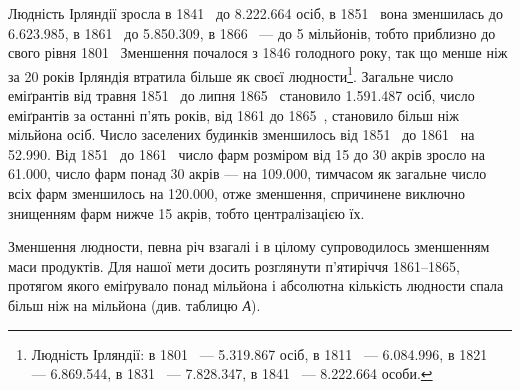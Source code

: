 Людність Ірляндії зросла в 1841~ до \num{8.222.664} осіб, в 1851~
вона зменшилась до \num{6.623.985}, в 1861~ до \num{5.850.309}, в 1866~ —
до 5 мільйонів, тобто приблизно до свого рівня 1801~ Зменшення
почалося з 1846 голодного року, так що менше ніж за
20 років Ірляндія втратила більше як  своєї людности\footnote{
Людність Ірляндії: в 1801~ — \num{5.319.867} осіб, в 1811~ — \num{6.084.996},
в 1821~ — \num{6.869.544}, в 1831~ — \num{7.828.347}, в 1841~ — \num{8.222.664} особи.
}.
Загальне число еміґрантів від травня 1851~ до липня 1865~
становило \num{1.591.487} осіб, число еміґрантів за останні п’ять років,
від 1861 до 1865~, становило більш ніж  мільйона осіб. Число
заселених будинків зменшилось від 1851~ до 1861~ на \num{52.990}.
Від 1851~ до 1861~ число фарм розміром від 15 до 30 акрів зросло
на \num{61.000}, число фарм понад 30 акрів — на \num{109.000}, тимчасом
як загальне число всіх фарм зменшилось на \num{120.000}, отже зменшення,
спричинене виключно знищенням фарм нижче 15 акрів,
тобто централізацією їх.

Зменшення людности, певна річ взагалі і в цілому супроводилось
зменшенням маси продуктів. Для нашої мети досить
розглянути п’ятиріччя 1861--1865, протягом якого еміґрувало
понад  мільйона і абсолютна кількість людности спала
більш ніж на  мільйона (див. таблицю \emph{А}).

